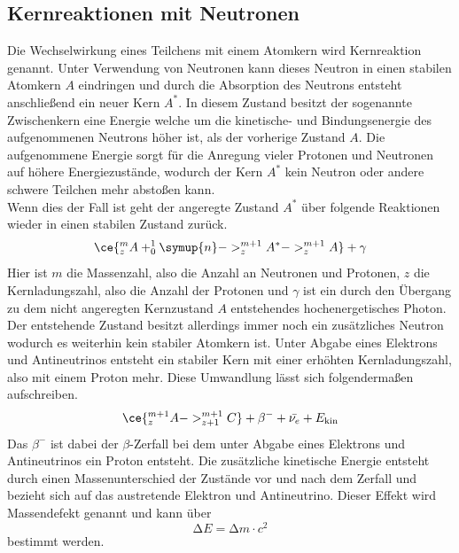 \subsection{Kernreaktionen mit Neutronen}
Die Wechselwirkung eines Teilchens mit einem Atomkern wird Kernreaktion genannt. 
Unter Verwendung von Neutronen kann dieses Neutron in einen stabilen Atomkern $A$ eindringen und durch die Absorption des Neutrons
entsteht anschließend ein neuer Kern $A^{*}$. In diesem Zustand besitzt der sogenannte Zwischenkern eine Energie welche um die kinetische- und Bindungsenergie
des aufgenommenen Neutrons höher ist, als der vorherige Zustand $A$. Die aufgenommene Energie sorgt für die Anregung vieler Protonen und Neutronen auf höhere Energiezustände,
wodurch der Kern $A^{*}$ kein Neutron oder andere schwere Teilchen mehr abstoßen kann. 
\\
Wenn dies der Fall ist geht der angeregte Zustand $A^{*}$ über folgende Reaktionen wieder in einen stabilen Zustand zurück.
\begin{equation*}
    \ce{^{m}_{z}A + ^{1}_{0}\symup{n} -> ^{m+1}_{z}A^{*} -> ^{m+1}_{z}A} + \gamma
\end{equation*}
Hier ist $m$ die Massenzahl, also die Anzahl an Neutronen und Protonen, $z$ die Kernladungszahl, also die Anzahl der Protonen und $\gamma$ ist ein durch den Übergang zu dem nicht angeregten Kernzustand $A$
entstehendes hochenergetisches Photon.
\\
Der entstehende Zustand besitzt allerdings immer noch ein zusätzliches Neutron wodurch es weiterhin kein stabiler Atomkern ist. Unter Abgabe eines Elektrons und Antineutrinos entsteht ein stabiler Kern
mit einer erhöhten Kernladungszahl, also mit einem Proton mehr. Diese Umwandlung lässt sich folgendermaßen aufschreiben.
\begin{equation}
\label{eqn:zerfalleinfach}
\ce{^{m+1}_{z}A -> ^{m+1}_{z+1}C} +\beta^{-} + \bar{\nu_{e}} + E_{\text{kin}}
\end{equation}
Das ${\beta}^{-}$ ist dabei der $\beta$-Zerfall bei dem unter Abgabe eines Elektrons und Antineutrinos ein Proton entsteht.
Die zusätzliche kinetische Energie entsteht durch einen Massenunterschied der Zustände vor und nach dem Zerfall und bezieht sich auf das austretende Elektron und Antineutrino. Dieser Effekt wird
Massendefekt genannt und kann über 
\begin{equation*}
\label{eqn:einsteineq}
\increment E = \increment m \cdot c^2
\end{equation*}
bestimmt werden. 
\\
